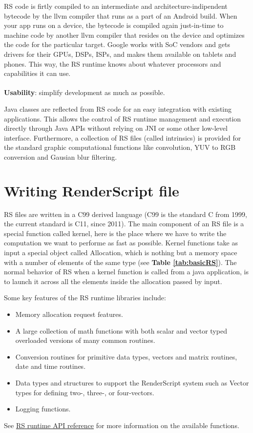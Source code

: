 \documentclass[a4paper,10pt]{article}
\begin{document}
\begin{multicols}{2}
RS code is firtly compiled to an intermediate and architecture-indipendent bytecode by the llvm compiler that runs as a part of an Android build. When your app runs on a device, the bytecode is compiled again just-in-time to machine code by another llvm compiler that resides on the device and optimizes the code for the particular target.
Google works with SoC vendors and gets drivers for their GPUs, DSPs, ISPs, and makes them available on tablets and phones. This way, the RS runtime knows about whatever processors and capabilities it can use.
\\\\
{\bf Usability}: simplify development as much as possible.

Java classes are reflected from RS code for an easy integration with existing applications. This allows the control of RS runtime management and execution directly through Java APIs without relying on JNI or some other low-level interface. Furthermore, a collection of RS files (called intrinsics) is provided for the standard graphic computational functions like convolution, YUV to RGB conversion and Gausian blur filtering.

\section{Writing RenderScript file}
RS files are written in a C99 derived language (C99 is the standard C from 1999, the current standard is C11, since 2011).
The main component of an RS file is a special function called kernel, here is the place where we have to write the computation we want to performe as fast as possible. Kernel functions take as input a special object called Allocation, which is nothing but a memory space with a number of elements of the same type (see {\bf Table \ref{tab:basicRS}}). The normal behavior of RS when a kernel function is called from a java application, is to launch it across all the elements inside the allocation passed by input.

Some key features of the RS runtime libraries include:
\begin{itemize}
\item Memory allocation request features.
\item A large collection of math functions with both scalar and vector typed overloaded versions of many common routines.
\item Conversion routines for primitive data types, vectors and matrix routines, date and time routines.
\item Data types and structures to support the RenderScript system such as Vector types for defining two-, three-, or four-vectors.
\item Logging functions.
\end{itemize}
See \href{http://developer.android.com/guide/topics/renderscript/reference.html}{RS runtime API reference} for more information on the available functions. \\


\end{multicols}
\end{document}
